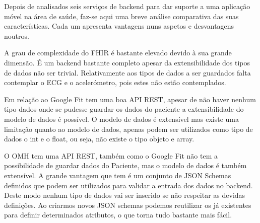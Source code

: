 Depois de analisados seis serviços de backend para dar suporte a uma aplicação móvel na área de saúde, faz-se aqui uma breve análise comparativa das suas características. Cada um apresenta vantagens nuns aspetos e desvantagens noutros.
\par 
A grau de complexidade do \gls{FHIR} é bastante elevado devido à sua grande dimensão. É um backend bastante completo apesar da extensibilidade dos tipos de dados não ser trivial. Relativamente aos tipos de dados a ser guardados falta contemplar o \gls{ECG} e o acelerómetro, pois estes não estão contemplados.
\par 
Em relação ao Google Fit tem uma boa \gls{API} \gls{REST}, apesar de não haver nenhum tipo dados onde se pudesse guardar os dados do paciente a extensibilidade do modelo de dados é possível. O modelo de dados é extensível mas existe uma limitação quanto ao modelo de dados, apenas podem ser utilizados como tipo de dados o int e o float, ou seja, não existe o tipo objeto e array.
\par 
O \gls{OMH} tem uma \gls{API} \gls{REST}, também como o Google Fit não tem a possibilidade de guardar dados do Paciente, mas o modelo de dados é também extensível. A grande vantagem que tem é um conjunto de \gls{JSON} Schemas definidos que podem ser utilizados para validar a entrada dos dados no backend. Deste modo nenhum tipo de dados vai ser inserido se não respeitar as devidas definições. Ao criarmos novos \gls{JSON} schemas podemos reutilizar os já existentes para definir determinados atributos, o que torna tudo bastante mais fácil.







\cleardoublepage